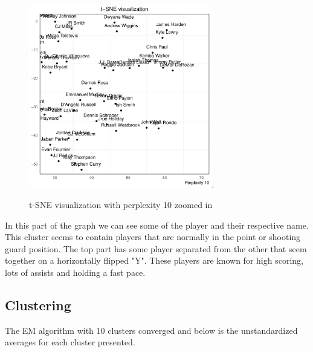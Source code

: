 \documentclass{article}
\begin{document}
 
\begin{figure}[H]
 \centering
 \includegraphics[height=8cm]{zoom10}.
 \caption{t-SNE visualization with perplexity 10 zoomed in}
 \label{figure:2}
\end{figure}

In this part of the graph we can see some of the player and their respective name. This cluster seems to contain players that are normally in the point or shooting guard position. The top part has some player separated from the other that seem together on a horizontally flipped "Y". These players are known for high scoring, lots of assists and holding a fast pace.
 
\newpage 
 
\subsection{Clustering} 

The EM algorithm with 10 clusters converged and below is the unstandardized averages for each cluster presented.

\begin{table}[ht]
\centering
{}
\caption{EM algorithm 10 cluster result: average shooting stats} 
\end{table}
\end{document}
